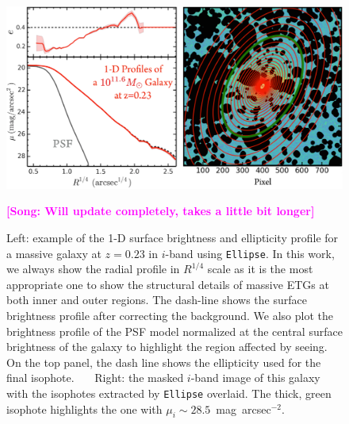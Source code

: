 \documentclass{emulateapj}
\def\sb{mag~arcsec$^{-2}$}
\newcommand{\song}[1]{\textcolor{magenta}{\textbf{[Song: #1]}}}
\newcommand{\alexie}[1]{\textcolor{blue}{\textbf{[Alexie: #1]}}}
\begin{document}
\begin{CJK*}{UTF8}{gbsn}
    \begin{figure}[bt]
        \centering 
        \includegraphics[width=\textwidth]{fig/redbcg_ellipse_example}
        \caption{Left: example of the 1-D surface brightness and ellipticity profile 
            for a massive galaxy at $z=0.23$ in $i$-band using \texttt{Ellipse}. 
            In this work, we always show the radial profile in $R^{1/4}$ scale as it 
            is the most appropriate one to show the structural details of massive 
            ETGs at both inner and outer regions. 
            The dash-line shows the surface brightness profile after correcting the 
            background. 
            We also plot the brightness profile of the PSF model normalized at the 
            central surface brightness of the galaxy to highlight the region affected 
            by seeing. 
            On the top panel, the dash line shows the ellipticity used for the final 
            isophote.~~~ 
            Right: the masked $i$-band image of this galaxy with the isophotes extracted 
            by \texttt{Ellipse} overlaid. 
            The thick, green isophote highlights the one with $\mu_{i}\sim 28.5$~\sb.}
            \song{Will update completely, takes a little bit longer}
        \label{fig:ellipse}
    \end{figure}


\end{CJK*}
\end{document}
